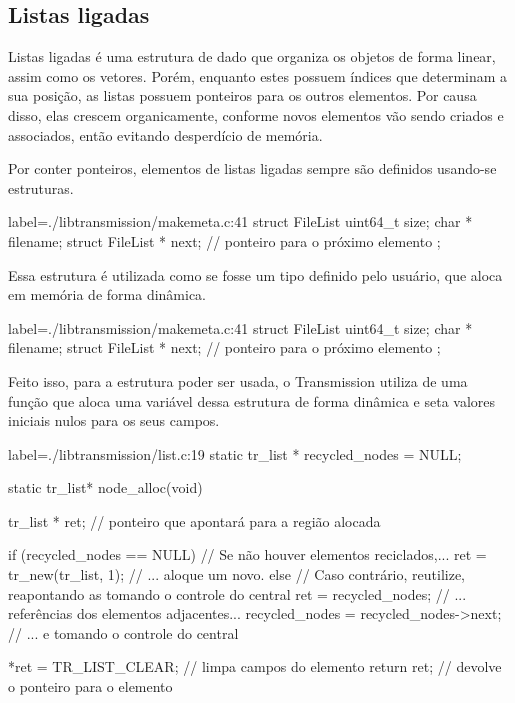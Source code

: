 
\newpage
\subsection*{Listas ligadas}

Listas ligadas é uma estrutura de dado que organiza os objetos de forma linear, assim
como os vetores. Porém, enquanto estes possuem índices que determinam a sua posição, as
listas possuem ponteiros para os outros elementos. Por causa disso, elas crescem
organicamente, conforme novos elementos vão sendo criados e associados, então evitando
desperdício de memória.

Por conter ponteiros, elementos de listas ligadas sempre são definidos usando-se
estruturas.

\begin{ccode*}{label=./libtransmission/makemeta.c:41}
struct FileList {
    uint64_t          size;
    char *            filename;
    struct FileList * next;      // ponteiro para o próximo elemento
};
\end{ccode*}

Essa estrutura é utilizada como se fosse um tipo definido pelo usuário, que aloca em
memória de forma dinâmica.

\begin{ccode*}{label=./libtransmission/makemeta.c:41}
struct FileList {
    uint64_t          size;
    char *            filename;
    struct FileList * next;      // ponteiro para o próximo elemento
};
\end{ccode*}

Feito isso, para a estrutura poder ser usada, o Transmission utiliza de uma função que
aloca uma variável dessa estrutura de forma dinâmica e seta valores iniciais nulos para
os seus campos.

\begin{ccode*}{label=./libtransmission/list.c:19}
static tr_list * recycled_nodes = NULL;

static tr_list* node_alloc(void) {
    tr_list * ret;                  // ponteiro que apontará para a região alocada

    if (recycled_nodes == NULL) {   // Se não houver elementos reciclados,...
        ret = tr_new(tr_list, 1);   // ... aloque um novo.
    }
    else {   // Caso contrário, reutilize, reapontando as tomando o controle do central
        ret = recycled_nodes;           // ... referências dos elementos adjacentes...
        recycled_nodes = recycled_nodes->next;   // ... e tomando o controle do central
    }

    *ret = TR_LIST_CLEAR;           // limpa campos do elemento
    return ret;                     // devolve o ponteiro para o elemento
}
\end{ccode*}

